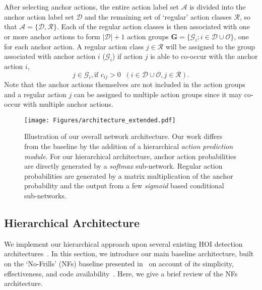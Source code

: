 After selecting anchor actions, the entire action {label} set $\mathcal{A}$ is divided into the anchor action {label} set $\mathcal{D}$ and the remaining set of `regular' action {classes} $\mathcal{R}$, so that $\mathcal{A} = \{\mathcal{D}, \mathcal{R}\}$.
Each of the regular action {classes} is then associated with one or more anchor actions to form $|\mathcal{D}|+1$ action groups $\mathbf{G} = \{\mathcal{G}_i; i \in \mathcal{D}\cup\mathcal{O}\}$, one for each anchor action. 
A regular action {class} $j \in \mathcal{R}$ will be assigned to the group associated with anchor action $i$ ($\mathcal{G}_i$) if action $j$ is able to co-occur with the anchor action $i$,
\begin{equation}
    j \in \mathcal{G}_i,  \text{if } c_{ij} > 0 \;\; (i \in \mathcal{D}\cup\mathcal{O}, j \in \mathcal{R}).
\label{eq:action_groups2}
\end{equation}
Note that the anchor actions themselves are not included in the action groups and a regular action $j$ can be assigned to multiple action groups since it may co-occur with multiple anchor actions.









  

\begin{figure*}[t]
\centering
\texttt{[image: Figures/architecture\_extended.pdf]}
    \vspace{-2mm}
    \caption{Illustration of our overall network architecture.
	Our work differs from the baseline \cite{gupta2019no} by the addition of a hierarchical \emph{action prediction module}.
	For our hierarchical architecture, anchor action probabilities are directly generated by a \emph{softmax} sub-network. Regular action probabilities are generated by a matrix multiplication of the anchor probability and the output from a few \emph{sigmoid} based conditional sub-networks.}
	\vspace{-2mm}
    \label{fig:model_merged}
\end{figure*}


\subsection{Hierarchical Architecture}
\label{sec.architecture}
We implement our hierarchical approach upon several existing HOI detection architectures~\cite{gao2020drg,gupta2019no,liao2020ppdm}.
In this section, we introduce our main baseline architecture, built on the `No-Frills' (NFs) baseline presented in~\cite{gupta2019no} on account of its simplicity, effectiveness, and code availability~\cite{nofrillsgit}.
Here, we give a brief review of the NFs architecture. 

